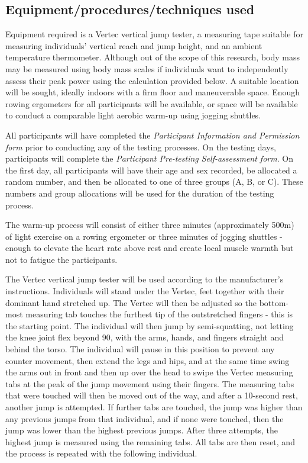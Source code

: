 \documentclass[stu, floatsintext, a4paper]{apa7}
\begin{document}
\subsection{Equipment/procedures/techniques used}
\label{sec:org71f21fd}

Equipment required is a Vertec vertical jump tester, a measuring tape suitable for measuring individuals' vertical reach and jump height, and an ambient temperature thermometer. Although out of the scope of this research, body mass may be measured using body mass scales if individuals want to independently assess their peak power using the calculation provided below. A suitable location will be sought, ideally indoors with a firm floor and maneuverable space. Enough rowing ergometers for all participants will be available, or space will be available to conduct a comparable light aerobic warm-up using jogging shuttles.

All participants will have completed the \emph{Participant Information and Permission form} prior to conducting any of the testing processes. On the testing days, participants will complete the \emph{Participant Pre-testing Self-assessment form}. On the first day, all participants will have their age and sex recorded, be allocated a random number, and then be allocated to one of three groups (A, B, or C). These numbers and group allocations will be used for the duration of the testing process.

The warm-up process will consist of either three minutes (approximately 500m) of light exercise on a rowing ergometer or three minutes of jogging shuttles - enough to elevate the heart rate above rest and create local muscle warmth but not to fatigue the participants.

The Vertec vertical jump tester will be used according to the manufacturer's instructions. Individuals will stand under the Vertec, feet together with their dominant hand stretched up. The Vertec will then be adjusted so the bottom-most measuring tab touches the furthest tip of the outstretched fingers - this is the starting point. The individual will then jump by semi-squatting, not letting the knee joint flex beyond 90, with the arms, hands, and fingers straight and behind the torso. The individual will pause in this position to prevent any counter movement, then extend the legs and hips, and at the same time swing the arms out in front and then up over the head to swipe the Vertec measuring tabs at the peak of the jump movement using their fingers. The measuring tabs that were touched will then be moved out of the way, and after a 10-second rest, another jump is attempted. If further tabs are touched, the jump was higher than any previous jumps from that individual, and if none were touched, then the jump was lower than the highest previous jumps. After three attempts, the highest jump is measured using the remaining tabs. All tabs are then reset, and the process is repeated with the following individual.
\end{document}
